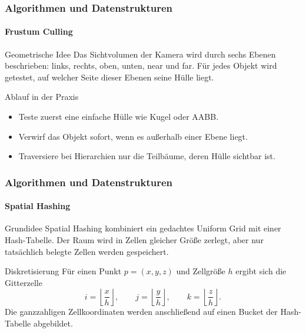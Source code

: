 \documentclass{beamer}
\begin{document}
\begin{frame}
    \frametitle{Algorithmen und Datenstrukturen}
    \framesubtitle{Frustum Culling}
    \small
    \begin{block}{Geometrische Idee}
    Das Sichtvolumen der Kamera wird durch sechs Ebenen beschrieben: links,
    rechts, oben, unten, near und far. F\"ur jedes Objekt wird getestet, auf
    welcher Seite dieser Ebenen seine H\"ulle liegt.
    \end{block}

    \begin{block}{Ablauf in der Praxis}
    \begin{itemize}
        \item Teste zuerst eine einfache H\"ulle wie Kugel oder AABB.
        \item Verwirf das Objekt sofort, wenn es au{\ss}erhalb einer Ebene liegt.
        \item Traversiere bei Hierarchien nur die Teilb\"aume, deren H\"ulle sichtbar ist.
    \end{itemize}
    \end{block}
\end{frame}




\begin{frame}
    \frametitle{Algorithmen und Datenstrukturen}
    \framesubtitle{Spatial Hashing}
    \small
    \begin{block}{Grundidee}
    Spatial Hashing kombiniert ein gedachtes Uniform Grid mit einer
    Hash-Tabelle. Der Raum wird in Zellen gleicher Gr\"o{\ss}e zerlegt,
    aber nur tats\"achlich belegte Zellen werden gespeichert.
    \end{block}

    \begin{block}{Diskretisierung}
    F\"ur einen Punkt \(p=(x,y,z)\) und Zellgr\"o{\ss}e \(h\) ergibt sich
    die Gitterzelle
    \[
    i = \left\lfloor \frac{x}{h} \right\rfloor,\qquad
    j = \left\lfloor \frac{y}{h} \right\rfloor,\qquad
    k = \left\lfloor \frac{z}{h} \right\rfloor.
    \]
    Die ganzzahligen Zellkoordinaten werden anschlie{\ss}end auf einen
    Bucket der Hash-Tabelle abgebildet.
    \end{block}
\end{frame}
\end{document}
